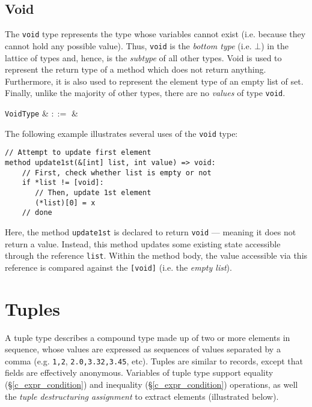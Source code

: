 
\subsection{Void}
\label{c_types_void}

The \lstinline{void} type represents the type whose variables cannot exist (i.e. because they cannot hold any possible value).  Thus, \lstinline{void} is the {\em bottom type} (i.e. $\bot$) in the lattice of types and, hence, is the {\em subtype} of all other types.  Void is used to represent the return type of a method which does not return anything.  Furthermore, it is also used to represent the element type of an empty list of set.  Finally, unlike the majority of other types, there are no {\em values} of type \lstinline{void}.

\begin{syntax}
   \verb+VoidType+ & $::=$ &  \\
\end{syntax}

\noindent The following example illustrates several uses of the \lstinline{void} type:

\begin{lstlisting}
// Attempt to update first element
method update1st(&[int] list, int value) => void:
    // First, check whether list is empty or not
    if *list != [void]:
       // Then, update 1st element
       (*list)[0] = x
    // done
\end{lstlisting}

Here, the method \lstinline{update1st} is declared to return \lstinline{void} --- meaning it does not return a value.  Instead, this method updates some existing state accessible through the reference \lstinline{list}.  Within the method body, the value accessible via this reference is compared against the \lstinline{[void]} (i.e. the {\em empty list}).


\section{Tuples}
\label{c_types_tuple}

A tuple type describes a compound type made up of two or more elements in sequence, whose values are expressed as sequences of values separated by a comma (e.g. \lstinline{1,2}, \lstinline{2.0,3.32,3.45}, etc).  Tuples are similar to records, except that fields are effectively anonymous.  Variables of tuple type support equality (\S\ref{c_expr_condition}) and inequality (\S\ref{c_expr_condition}) operations, as well the {\em tuple destructuring assignment} to extract elements (illustrated below).

